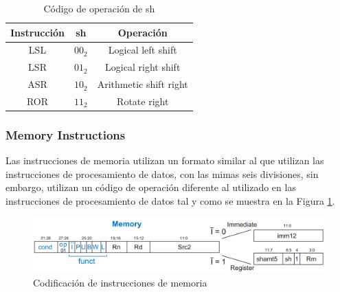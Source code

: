 \documentclass[journal,trans]{IEEEtran}
\begin{document}
	\begin{table}[h]
		\centering
		\begin{tabular}{|c|c|c|}
			\hline
			Instrucción & sh       & Operación \\
			\hline
			\hline
			LSL         & $00_{2}$ & Logical left shift \\
			\hline
			LSR         & $01_{2}$ & Logical right shift \\
			\hline
			ASR         & $10_{2}$ & Arithmetic shift right \\
			\hline
			ROR         & $11_{2}$ & Rotate right \\
			\hline
		\end{tabular}
		\caption{Código de operación de sh}
		\label{tab:sh}
	\end{table}
	
	\subsubsection{Memory Instructions}
	Las instrucciones de memoria utilizan un formato similar al que utilizan las instrucciones de procesamiento de datos, con las mimas seis divisiones, sin embargo, utilizan un código de operación diferente al utilizado en las instrucciones de procesamiento de datos tal y como se muestra en la Figura \ref{fig:MemoryP}.
	
	\begin{figure}[h]
		\centering
		\includegraphics[width=\linewidth]{img/mempro.png}
		\caption{Codificación de instrucciones de memoria \cite{SarahLHarris2010}}
		\label{fig:MemoryP}
	\end{figure}
	
\end{document}
